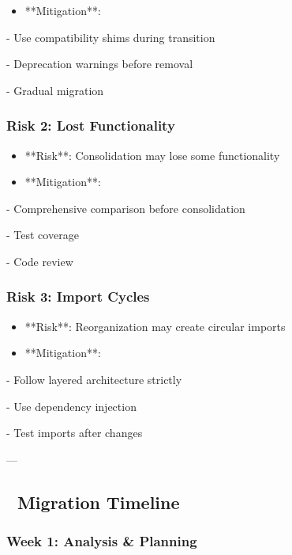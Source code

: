 \documentclass[11pt,a4paper]{article}
\begin{document}
\begin{itemize}
\item **Mitigation**: 
\end{itemize}

  - Use compatibility shims during transition

  - Deprecation warnings before removal

  - Gradual migration

\subsubsection{Risk 2: Lost Functionality}

\begin{itemize}
\item **Risk**: Consolidation may lose some functionality
\end{itemize}

\begin{itemize}
\item **Mitigation**:
\end{itemize}

  - Comprehensive comparison before consolidation

  - Test coverage

  - Code review

\subsubsection{Risk 3: Import Cycles}

\begin{itemize}
\item **Risk**: Reorganization may create circular imports
\end{itemize}

\begin{itemize}
\item **Mitigation**:
\end{itemize}

  - Follow layered architecture strictly

  - Use dependency injection

  - Test imports after changes

---

\subsection{🚀 Migration Timeline}

\subsubsection{Week 1: Analysis & Planning}
\end{document}
